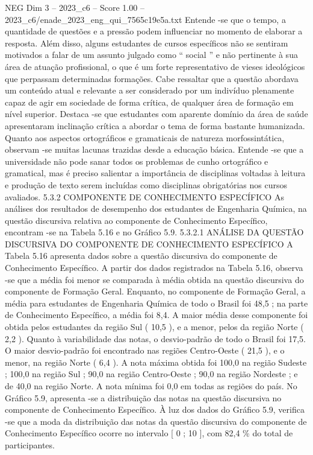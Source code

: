 \begin{textsample}{NEG Dim 3 – 2023\_c6 – Score 1.00 – 2023\_c6/enade\_2023\_eng\_qui\_7565c19e5a.txt}
Entende -se que o tempo, a quantidade de questões e a pressão podem influenciar no momento de elaborar a resposta.
Além disso, alguns estudantes de cursos específicos não se sentiram motivados a falar de um assunto julgado como “ social ” e não pertinente à sua área de atuação profissional, o que é um forte representativo de vieses ideológicos que perpassam determinadas formações.
Cabe ressaltar que a questão abordava um conteúdo atual e relevante a ser considerado por um indivíduo plenamente capaz de agir em sociedade de forma crítica, de qualquer área de formação em nível superior.
Destaca -se que estudantes com aparente domínio da área de saúde apresentaram inclinação crítica a abordar o tema de forma bastante humanizada.
Quanto aos aspectos ortográficos e gramaticais de natureza morfossintática, observam -se muitas lacunas trazidas desde a educação básica.
Entende -se que a universidade não pode sanar todos os problemas de cunho ortográfico e gramatical, mas é preciso salientar a importância de disciplinas voltadas à leitura e produção de texto serem incluídas como disciplinas obrigatórias nos cursos avaliados. 5.3.2 COMPONENTE DE CONHECIMENTO ESPECÍFICO As análises dos resultados de desempenho dos estudantes de Engenharia Química, na questão discursiva relativa ao componente de Conhecimento Específico, encontram -se na Tabela 5.16 e no Gráfico 5.9. 5.3.2.1 ANÁLISE DA QUESTÃO DISCURSIVA DO COMPONENTE DE CONHECIMENTO ESPECÍFICO A Tabela 5.16 apresenta dados sobre a questão discursiva do componente de Conhecimento Específico.
A partir dos dados registrados na Tabela 5.16, observa -se que a média foi menor se comparada à média obtida na questão discursiva do componente de Formação Geral.
Enquanto, no componente de Formação Geral, a média para estudantes de Engenharia Química de todo o Brasil foi 48,5 ; na parte de Conhecimento Específico, a média foi 8,4.
A maior média desse componente foi obtida pelos estudantes da região Sul ( 10,5 ), e a menor, pelos da região Norte ( 2,2 ).
Quanto à variabilidade das notas, o desvio-padrão de todo o Brasil foi 17,5.
O maior desvio-padrão foi encontrado nas regiões Centro-Oeste ( 21,5 ), e o menor, na região Norte ( 6,4 ).
A nota máxima obtida foi 100,0 na região Sudeste ; 100,0 na região Sul ; 90,0 na região Centro-Oeste ; 90,0 na região Nordeste ; e de 40,0 na região Norte.
A nota mínima foi 0,0 em todas as regiões do país.
No Gráfico 5.9, apresenta -se a distribuição das notas na questão discursiva no componente de Conhecimento Específico.
À luz dos dados do Gráfico 5.9, verifica -se que a moda da distribuição das notas da questão discursiva do componente de Conhecimento Específico ocorre no intervalo [ 0 ; 10 ], com 82,4 \% do total de participantes.

\end{textsample}

